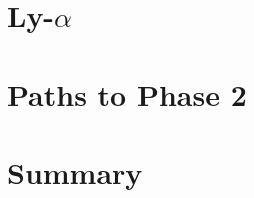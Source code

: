 \documentclass{PoS}
\begin{document}
\section{Ly-$\alpha$}


\section{Paths to Phase 2}

\section{Summary}




{}
\end{document}
